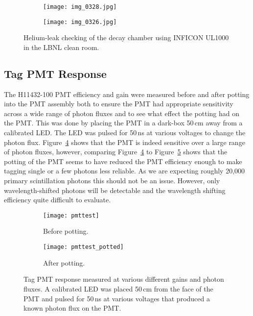 \begin{figure}
        \centering
        \begin{subfigure}[b]{0.48\textwidth}
                \centering
                \texttt{[image: img\_0328.jpg]}
                \caption{}
                \label{fig:HeLeakCheckSetup}
        \end{subfigure}%
        \vspace{0.2cm}
        \begin{subfigure}[b]{0.45\textwidth}
                \centering
                \texttt{[image: img\_0326.jpg]}
                \caption{}
                \label{fig:HeLeakCheckResult}
        \end{subfigure}
        \caption{Helium-leak checking of the decay chamber using INFICON UL1000 in the LBNL clean room.}
\label{fig:HeLeakCheck}
\end{figure}

\subsection{Tag PMT Response}
\label{sec:tagpmt}
The H11432-100 PMT efficiency and gain were measured before and after potting into the PMT assembly both to ensure the PMT had appropriate sensitivity across a wide range of photon fluxes and to see what effect the potting had on the PMT. This was done by placing the PMT in a dark-box 50\,cm away from a calibrated LED. The LED was pulsed for 50\,ns at various voltages to change the photon flux. Figure~\ref{fig:pmttest} shows that the PMT is indeed sensitive over a large range of photon fluxes, however, comparing Figure~\ref{fig:pmttest} to Figure~\ref{fig:pmtafterpotting} shows that the potting of the PMT seems to have reduced the PMT efficiency enough to make tagging single or a few photons less reliable. As we are expecting roughly 20,000 primary scintillation photons this should not be an issue. However, only wavelength-shifted photons will be detectable and the wavelength shifting efficiency quite difficult to evaluate.

\begin{figure}
    \begin{subfigure}{0.49\textwidth}
        \caption{Before potting.}
        \label{fig:pmttest}
        \texttt{[image: pmttest]}
    \end{subfigure}%
    \begin{subfigure}{0.49\textwidth}
        \caption{After potting.}
        \label{fig:pmtafterpotting}
        \texttt{[image: pmttest\_potted]}
    \end{subfigure}
    \caption{Tag PMT response measured at various different gains and photon fluxes. A calibrated LED was placed 50\,cm from the face of the PMT and pulsed for 50\,ns at various voltages that produced a known photon flux on the PMT.}
	\label{fig:calibratedled}
\end{figure}

